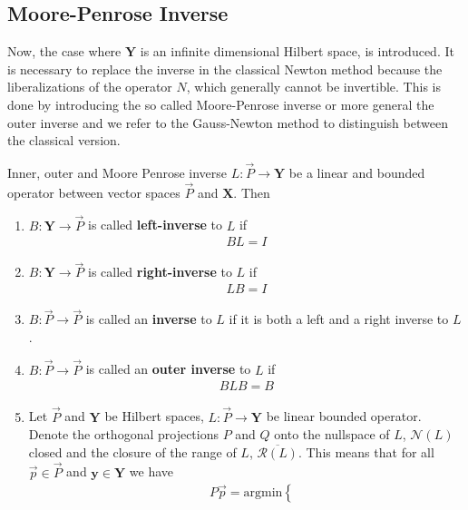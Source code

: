 \subsection{Moore-Penrose Inverse}
Now, the case where $\mathbf{Y}$  is an infinite dimensional Hilbert
space, is introduced. It is necessary to replace the inverse in the classical
Newton method because the liberalizations of the operator $N$, which
generally cannot be invertible. This is done by introducing the so called
Moore-Penrose inverse or more general the outer inverse and we refer to the
Gauss-Newton method to distinguish between the classical version.
\begin{mydef}{Inner, outer and Moore Penrose inverse
        \label{def: moore-penrose}}
    $L: \vec{P} \to \mathbf{Y}$ be a linear and bounded operator between
    vector spaces $\vec{P}$ and $\mathbf{X}$. Then
    \begin{enumerate}
        \item $B: \mathbf{Y} \to \vec{P}$ is called \textbf{left-inverse} to
            $L$ if
            \begin{align}
                BL = I
            \end{align}
        \item $B: \mathbf{Y} \to \vec{P}$ is called \textbf{right-inverse} to
            $L$ if
            \begin{align}
                LB = I
            \end{align}
        \item $B: \vec{P} \to \vec{P}$ is called an \textbf{inverse} to
            $L$ if it is both a left and a right inverse to $L$.
        \item $B: \vec{P} \to \vec{P}$ is called an \textbf{outer inverse} to
            $L$ if
            \begin{align}
                BLB = B
            \end{align}
        \item Let $\vec{P}$ and $\mathbf{Y}$ be Hilbert spaces, $L: \vec{P}
            \to \mathbf{Y}$ be linear bounded operator. Denote the
            orthogonal projections $P$ and $Q$ onto the nullspace of $L$,
            $\mathcal{N}(L)$ closed and the closure of the range of $L$,
            $\overline{\mathcal{R}\left(L  \right)} $. This means that for all $\vec{p}
            \in \vec{P}$ and $\mathbf{y} \in \mathbf{Y}$ we have
            \begin{align}
                &P\vec{p} = \text{argmin}
                \left\{

\end{align}
\end{enumerate}
\end{mydef}
